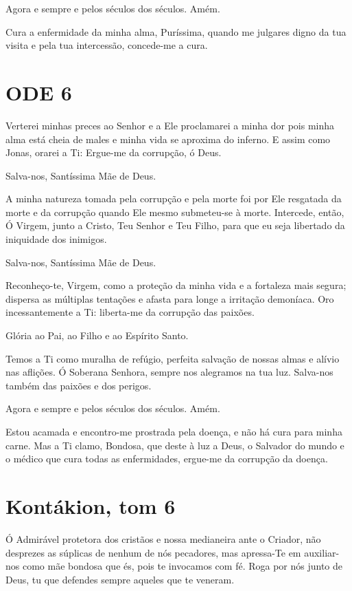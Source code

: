 \documentclass{subfiles}
\begin{document}
Agora e sempre e pelos séculos dos séculos. Amém.

Cura a enfermidade da minha alma, Puríssima, quando me julgares digno da tua
visita e pela tua intercessão, concede-me a cura.

\section*{ODE 6}

\eirmos{}Verterei minhas preces ao Senhor e a Ele proclamarei a minha
dor pois minha alma está cheia de males e minha vida se aproxima do inferno.
E assim como Jonas, orarei a Ti: Ergue-me da corrupção, ó Deus.

Salva-nos, Santíssima Mãe de Deus.

A minha natureza tomada pela corrupção e pela morte foi por Ele
resgatada da morte e da corrupção quando Ele mesmo submeteu-se à morte.
Intercede, então, Ó Virgem, junto a Cristo, Teu Senhor e Teu Filho, para que eu
seja libertado da iniquidade dos inimigos.

Salva-nos, Santíssima Mãe de Deus.

Reconheço-te, Virgem, como a proteção da minha vida e a fortaleza
mais segura; dispersa as múltiplas tentações e afasta para longe a irritação
demoníaca. Oro incessantemente a Ti: liberta-me da corrupção das paixões.

Glória ao Pai, ao Filho e ao Espírito Santo.

Temos a Ti como muralha de refúgio, perfeita salvação de nossas
almas e alívio nas aflições. Ó Soberana Senhora, sempre nos alegramos na tua
luz. Salva-nos também das paixões e dos perigos.

Agora e sempre e pelos séculos dos séculos. Amém.

Estou acamada e encontro-me prostrada pela doença, e não há cura
para minha carne. Mas a Ti clamo, Bondosa, que deste à luz a Deus, o Salvador
do mundo e o médico que cura todas as enfermidades, ergue-me da corrupção
da doença.

\section*{Kontákion, tom 6}

Ó Admirável protetora dos cristãos e nossa medianeira ante o Criador,
não desprezes as súplicas de nenhum de nós pecadores, mas apressa-Te em
auxiliar-nos como mãe bondosa que és, pois te invocamos com fé. Roga por
nós junto de Deus, tu que defendes sempre aqueles que te veneram.
\end{document}
